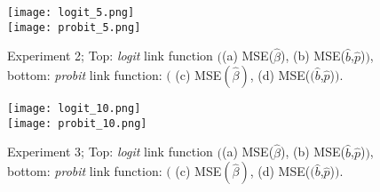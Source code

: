 \begin{figure}[!!ht!!]
\centering
	\texttt{[image: logit\_5.png]}\\
	\texttt{[image: probit\_5.png]}
	\caption{Experiment 2; Top: \textit{logit} link function $\Big($(a) MSE($\widehat{\beta}$), (b) MSE($\widehat{b}$,$\widehat{p}$)$\Big)$, bottom: \textit{probit} link function: $\Big($ (c) MSE$(\widehat{\beta})$, (d) MSE($(\widehat{b}$,$\widehat{p}$)$\Big)$.}
	\label{mse_5}
\end{figure}


\begin{figure}[!!ht!!]
\centering
	\texttt{[image: logit\_10.png]}\\
	\texttt{[image: probit\_10.png]}
	\caption{Experiment 3; Top: \textit{logit} link function $\Big($(a) MSE($\widehat{\beta}$), (b) MSE($\widehat{b}$,$\widehat{p}$)$\Big)$, bottom: \textit{probit} link function: $\Big($ (c) MSE$(\widehat{\beta})$, (d) MSE($(\widehat{b}$,$\widehat{p}$)$\Big)$.}
	\label{mse_10}
\end{figure}

